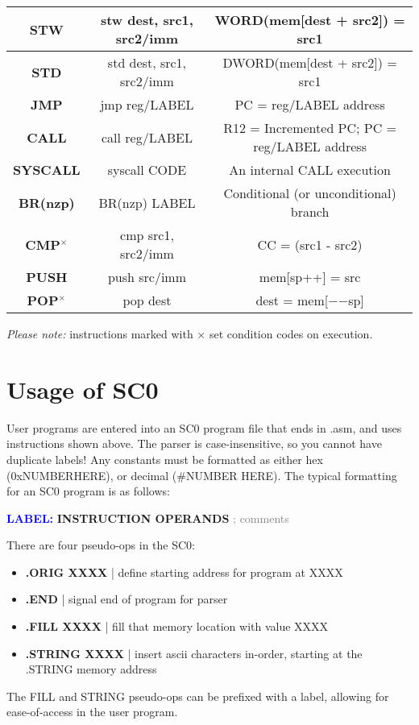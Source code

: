 \documentclass{article}
\newcommand*\scc[1]{{#1}\textbf{$^\times$}}
\begin{document}
\begin{tableofcontents}
\begin{center}
\begin{tabular}{|c|c|c|}
\textbf{STW} & stw dest, src1, src2/imm & WORD(mem[dest + src2]) = src1 \\
\hline
\textbf{STD} & std dest, src1, src2/imm & DWORD(mem[dest + src2]) = src1 \\
\hline
\textbf{JMP} & jmp reg/LABEL & PC = reg/LABEL address \\
\hline
\textbf{CALL} & call reg/LABEL & R12 = Incremented PC; PC = reg/LABEL address \\
\hline
\textbf{SYSCALL} & syscall CODE & An internal CALL execution \\
\hline
\textbf{BR(nzp)} & BR(nzp) LABEL & Conditional (or unconditional) branch \\
\hline
\textbf{\scc{CMP}} & cmp src1, src2/imm & CC = (src1 - src2) \\
\hline
\textbf{PUSH} & push src/imm & mem[sp++] = src \\
\hline
\textbf{\scc{POP}} & pop dest & dest = mem[$-$$-$sp] \\
\hline
\end{tabular}
\end{center}
\textit{\Large Please note:} instructions marked with $\times$ set condition codes on execution.
\section{\Huge Usage of SC0}
\begin{Large}
User programs are entered into an SC0 program file that ends in .asm, 
and uses instructions shown above. The parser is case-insensitive,
so you cannot have duplicate labels! Any constants must be formatted
as either hex (0xNUMBERHERE), or decimal (\#NUMBER HERE).
The typical formatting for an SC0 program is as follows:
\begin{center}
\textcolor{blue}{\textbf{LABEL:}} \textbf{INSTRUCTION OPERANDS} \textcolor{gray}{; comments}
\end{center}
There are four pseudo-ops in the SC0:
\begin{itemize}
    \item \textbf{.ORIG XXXX} | define starting address for program at XXXX
    \item \textbf{.END} | signal end of program for parser
    \item \textbf{.FILL XXXX} | fill that memory location with value XXXX
    \item \textbf{.STRING XXXX} | insert ascii characters in-order, starting at the .STRING memory address
\end{itemize}
The FILL and STRING pseudo-ops can be prefixed with a label, allowing for ease-of-access
in the user program.


\end{Large}
\end{tableofcontents}
\end{document}
